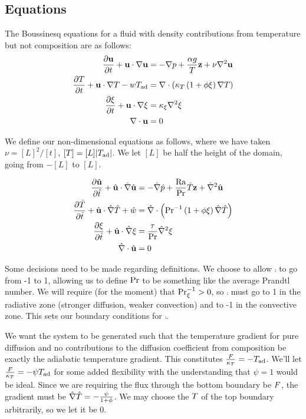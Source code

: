 \subsection{Equations} %
\label{sub:equations}

	The Boussinesq equations for a fluid with density contributions from temperature but not composition are as follows:
	\begin{align}
		\frac{\partial{\mathbf{u}}}{\partial{t}}+\mathbf{u}\cdot\nabla\mathbf{u}&=-\nabla p+\frac{\alpha g}{T}\mathbf{z}+\nu\nabla^{2}\mathbf{u}\\
		\frac{\partial{T}}{\partial{t}}+\mathbf{u}\cdot\nabla T-wT_{\mathrm{ad}}&=\nabla\cdot\left(\kappa_{T}\left(1+\phi\xi\right)\nabla T\right)\\
		\frac{\partial{\xi}}{\partial{t}}+\mathbf{u}\cdot\nabla\xi&=\kappa_{\xi}\nabla^{2}\xi\\
		\nabla\cdot\mathbf{u}&=0
	\end{align}

	We define our non-dimensional equations as follows, where we have taken $\nu=[L]^{2}/[t]$, $[T]=[L]|T_{\mathrm{ad}}|$.
	We let $[L]$ be half the height of the domain, going from $-[L]$ to $[L]$.

	\begin{align}
		\frac{\partial{\hat{\mathbf{u}}}}{\partial{\hat{t}}}+\hat{\mathbf{u}}\cdot\hat{\nabla}\hat{\mathbf{u}}&=-\hat{\nabla}\hat{p}+\frac{\mathrm{Ra}}{\mathrm{Pr}}\hat{T}\mathbf{z}+\hat{\nabla}^{2}\hat{\mathbf{u}}\\
		\frac{\partial{\hat{T}}}{\partial{\hat{t}}}+\hat{\mathbf{u}}\cdot\hat{\nabla}\hat{T}+\hat{w}&=\hat{\nabla}\cdot\left(\mathrm{Pr}^{-1}\left(1+\phi\xi\right)\hat{\nabla}\hat{T}\right)\\
		\frac{\partial{\xi}}{\partial{\hat{t}}}+\hat{\mathbf{u}}\cdot\hat{\nabla}\xi&=\frac{\tau}{\mathrm{Pr}}\hat{\nabla}^{2}\xi\\
		\hat{\nabla}\cdot\hat{\mathbf{u}}&=0
	\end{align}

	Some decisions need to be made regarding definitions.
	We choose to allow $\comp$ to go from -1 to 1, allowing us to define $\mathrm{Pr}$ to be something like the average Prandtl number.
	We will require (for the moment) that $\mathrm{Pr}_{\xi}^{-1}>0$, so $\comp$ must go to 1 in the radiative zone (stronger diffusion, weaker convection) and to -1 in the convective zone.
	This sets our boundary conditions for $\comp$.

	We want the system to be generated such that the temperature gradient for pure diffusion and no contributions to the diffusion coefficient from composition be exactly the adiabatic temperature gradient.
		This constitutes $\frac{F}{\kappa_{T}}=-T_{\mathrm{ad}}$.
		We'll let $\frac{F}{\kappa_{T}}=-\psi T_{\mathrm{ad}}$ for some added flexibility with the understanding that $\psi=1$ would be ideal.
	Since we are requiring the flux through the bottom boundary be $F$, the gradient must be $\hat{\nabla}\hat{T}=-\frac{\psi}{1+\phi}$.
		We may choose the $T$ of the top boundary arbitrarily, so we let it be 0.


